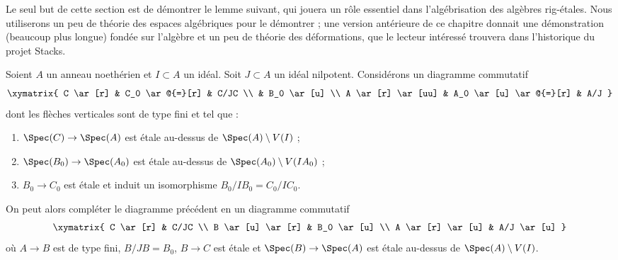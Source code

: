 \noindent
Le seul but de cette section est de démontrer le lemme suivant, qui jouera un
rôle essentiel dans l'algébrisation des algèbres rig-étales. Nous utiliserons
un peu de théorie des espaces algébriques pour le démontrer ; une version
antérieure de ce chapitre donnait une démonstration (beaucoup plus longue)
fondée sur l'algèbre et un peu de théorie des déformations, que le lecteur
intéressé trouvera dans l'historique du projet Stacks.

\begin{lemma}
\label{lemma-lift-approximation}
Soient $A$ un anneau noethérien et $I \subset A$ un idéal. Soit
$J \subset A$ un idéal nilpotent. Considérons un diagramme commutatif
$$
\xymatrix{
C \ar[r] & C_0 \ar@{=}[r] & C/JC \\
& B_0 \ar[u] \\
A \ar[r] \ar[uu] & A_0 \ar[u] \ar@{=}[r] & A/J
}
$$
dont les flèches verticales sont de type fini et tel que :
\begin{enumerate}
\item $\Spec(C) \to \Spec(A)$ est étale au-dessus de
$\Spec(A) \setminus V(I)$ ;
\item $\Spec(B_0) \to \Spec(A_0)$ est étale au-dessus de
$\Spec(A_0) \setminus V(IA_0)$ ;
\item $B_0 \to C_0$ est étale et induit un isomorphisme
$B_0/IB_0 = C_0/IC_0$.
\end{enumerate}
On peut alors compléter le diagramme précédent en un diagramme commutatif
$$
\xymatrix{
C \ar[r] & C/JC \\
B \ar[u] \ar[r] & B_0 \ar[u] \\
A \ar[r] \ar[u] & A/J \ar[u]
}
$$
où $A \to B$ est de type fini, $B/JB = B_0$, $B \to C$ est étale et
$\Spec(B) \to \Spec(A)$ est étale au-dessus de
$\Spec(A) \setminus V(I)$.
\end{lemma}

